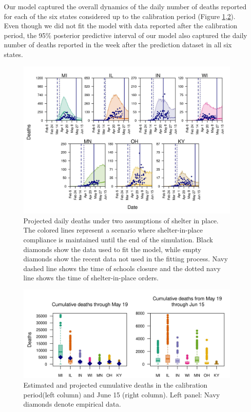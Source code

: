 \documentclass[11pt]{article}
\begin{document}
Our model captured the overall dynamics of the daily number of deaths reported for each of the six states considered up to the calibration period (Figure \ref{fig_deaths_forecast},\ref{fig_deaths_cumulative}). Even though we did not fit the model with data reported after the calibration period, the 95\% posterior predictive interval of our model also captured the daily number of deaths reported in the week after the prediction dataset in all six states.


\begin{figure}[hb!]
\centering
\includegraphics[width=\textwidth]{../figures/report_figure_deaths_forecast.jpeg} 
\caption{\label{fig_deaths_forecast} Projected daily deaths under two assumptions of shelter in place. The colored lines represent a scenario where shelter-in-place compliance is maintained until the end of the simulation. Black diamonds show the data used to fit the model, while empty diamonds show the recent data not used in the fitting process. Navy dashed line shows the time of schools closure and the dotted navy line shows the time of shelter-in-place orders.}
\end{figure}

\begin{figure}[hb!]
\centering
\includegraphics[width=\textwidth]{../figures/report_figure_deaths_cumulative.jpeg} 
\caption{\label{fig_deaths_cumulative}Estimated and projected cumulative deaths in the calibration period(left column) and June 15 (right column). Left panel: Navy diamonds denote empirical data.}
\end{figure}
\end{document}
